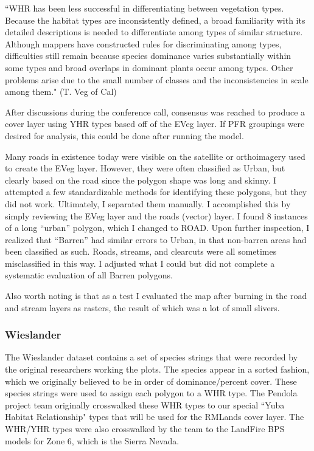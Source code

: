 ``WHR has been less successful in differentiating between vegetation types. Because the habitat types are inconsistently defined, a broad familiarity with its detailed descriptions is needed to differentiate among types of similar structure. Although mappers have constructed rules for discriminating among types, difficulties still remain because species dominance varies substantially within some types and broad overlaps in dominant plants occur among types. Other problems arise due to the small number of classes and the inconsistencies in scale among them." (T. Veg of Cal)

After discussions during the conference call, consensus was reached to produce a cover layer using YHR types based off of the EVeg layer. If PFR groupings were desired for analysis, this could be done after running the model.

Many roads in existence today were visible on the satellite or orthoimagery used to create the EVeg layer. However, they were often classified as Urban, but  clearly based on the road since the polygon shape was long and skinny. I attempted a few standardizable methods for identifying these polygons, but they did not work. Ultimately, I separated them manually. I accomplished this by simply reviewing the EVeg layer and the roads (vector) layer. I found 8 instances of a long ``urban'' polygon, which I changed to ROAD. Upon further inspection, I realized that ``Barren'' had similar errors to Urban, in that non-barren areas had been classified as such. Roads, streams, and clearcuts were all sometimes misclassified in this way. I adjusted what I could but did not complete a systematic evaluation of all Barren polygons.

Also worth noting is that as a test I evaluated the map after burning in the road and stream layers as rasters, the result of which was a lot of small slivers. %

\subsubsection{Wieslander}
The Wieslander dataset contains a set of species strings that were recorded by the original researchers working the plots. The species appear in a sorted fashion, which we originally believed to be in order of dominance/percent cover. These species strings were used to assign each polygon to a WHR type. The Pendola project team originally crosswalked these WHR types to our special ``Yuba Habitat Relationship" types that will be used for the RMLands cover layer. The WHR/YHR types were also crosswalked by the team to the LandFire BPS models for Zone 6, which is the Sierra Nevada. 

